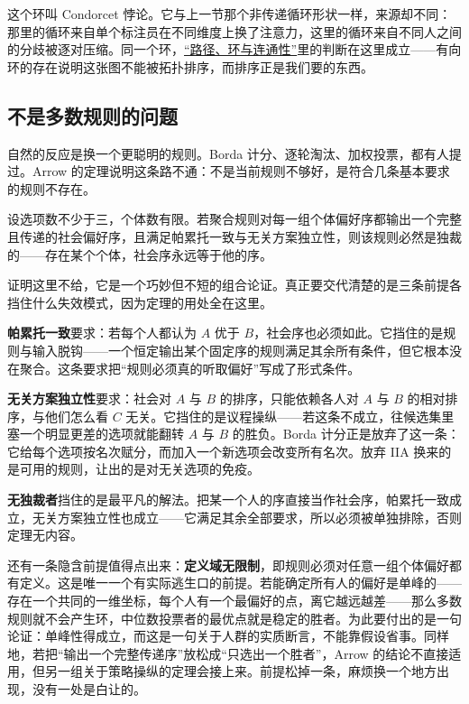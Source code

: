 这个环叫 Condorcet 悖论。它与上一节那个非传递循环形状一样，来源却不同：那里的循环来自单个标注员在不同维度上换了注意力，这里的循环来自不同人之间的分歧被逐对压缩。同一个环，\hyperref[sec:04-Discrete-Mathematics/03-Graph-Theory/02]{``路径、环与连通性''}里的判断在这里成立——有向环的存在说明这张图不能被拓扑排序，而排序正是我们要的东西。

\subsection{不是多数规则的问题}

自然的反应是换一个更聪明的规则。Borda 计分、逐轮淘汰、加权投票，都有人提过。Arrow 的定理说明这条路不通：不是当前规则不够好，是符合几条基本要求的规则不存在。

\begin{theorem}[Arrow]
设选项数不少于三，个体数有限。若聚合规则对每一组个体偏好序都输出一个完整且传递的社会偏好序，且满足帕累托一致与无关方案独立性，则该规则必然是独裁的——存在某个个体，社会序永远等于他的序。
\end{theorem}

证明这里不给，它是一个巧妙但不短的组合论证。真正要交代清楚的是三条前提各挡住什么失效模式，因为定理的用处全在这里。

\textbf{帕累托一致}要求：若每个人都认为 \(A\) 优于 \(B\)，社会序也必须如此。它挡住的是规则与输入脱钩——一个恒定输出某个固定序的规则满足其余所有条件，但它根本没在聚合。这条要求把``规则必须真的听取偏好''写成了形式条件。

\textbf{无关方案独立性}要求：社会对 \(A\) 与 \(B\) 的排序，只能依赖各人对 \(A\) 与 \(B\) 的相对排序，与他们怎么看 \(C\) 无关。它挡住的是议程操纵——若这条不成立，往候选集里塞一个明显更差的选项就能翻转 \(A\) 与 \(B\) 的胜负。Borda 计分正是放弃了这一条：它给每个选项按名次赋分，而加入一个新选项会改变所有名次。放弃 IIA 换来的是可用的规则，让出的是对无关选项的免疫。

\textbf{无独裁者}挡住的是最平凡的解法。把某一个人的序直接当作社会序，帕累托一致成立，无关方案独立性也成立——它满足其余全部要求，所以必须被单独排除，否则定理无内容。

还有一条隐含前提值得点出来：\textbf{定义域无限制}，即规则必须对任意一组个体偏好都有定义。这是唯一一个有实际逃生口的前提。若能确定所有人的偏好是单峰的——存在一个共同的一维坐标，每个人有一个最偏好的点，离它越远越差——那么多数规则就不会产生环，中位数投票者的最优点就是稳定的胜者。为此要付出的是一句论证：单峰性得成立，而这是一句关于人群的实质断言，不能靠假设省事。同样地，若把``输出一个完整传递序''放松成``只选出一个胜者''，Arrow 的结论不直接适用，但另一组关于策略操纵的定理会接上来。前提松掉一条，麻烦换一个地方出现，没有一处是白让的。

